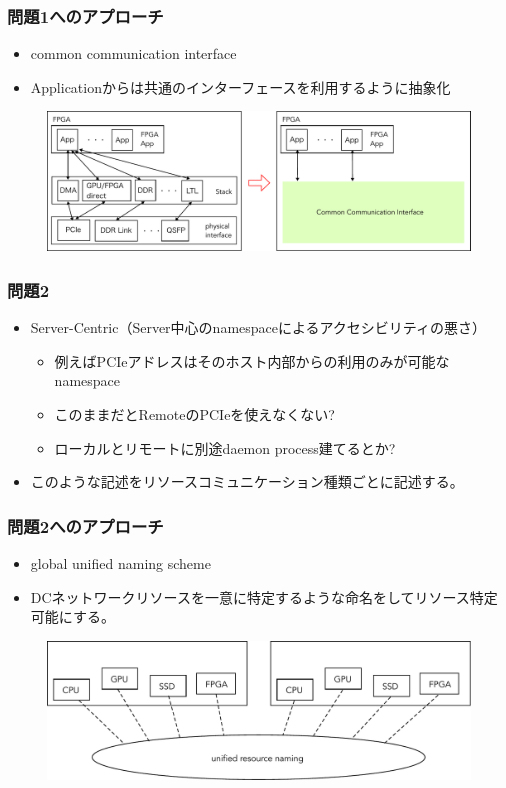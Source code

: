 \documentclass[dvipdfmx,9pt,notheorems]{beamer}
\theoremstyle{definition}
\begin{document}
\begin{frame}\frametitle{問題1へのアプローチ}
	\begin{itemize}
		\item common communication interface
		\item Applicationからは共通のインターフェースを利用するように抽象化
	\end{itemize}
  \begin{figure}[htb]
		\includegraphics[width=\linewidth]{fig/ez_FPGA_common_communication_interface.pdf}
  \end{figure}
	\pnote{
	}
\end{frame}

\begin{frame}\frametitle{問題2}
	\begin{itemize}
		\item Server-Centric（Server中心のnamespaceによるアクセシビリティの悪さ）
			\begin{itemize}
				\item 例えばPCIeアドレスはそのホスト内部からの利用のみが可能なnamespace
				\item このままだとRemoteのPCIeを使えなくない?
				\item ローカルとリモートに別途daemon process建てるとか?
			\end{itemize}
			\item このような記述をリソースコミュニケーション種類ごとに記述する。
	\end{itemize}
	\pnote{
	}
\end{frame}

\begin{frame}\frametitle{問題2へのアプローチ}
	\begin{itemize}
		\item global unified naming scheme
		\item DCネットワークリソースを一意に特定するような命名をしてリソース特定可能にする。
	\end{itemize}
  \begin{figure}[htb]
		\includegraphics[width=\linewidth]{fig/ez_FPGA_unified_naming_scheme.pdf}
  \end{figure}
	\pnote{
	}
\end{frame}
\end{document}
